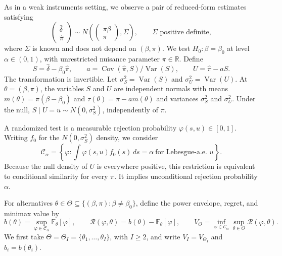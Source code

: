 \documentclass[11pt]{article}
\DeclareMathOperator{\Cov}{Cov}
\DeclareMathOperator{\Var}{Var}
\newcommand{\E}{\mathbb{E}}
\newcommand{\CS}{\mathcal{C}_{\alpha}}
\newcommand{\Reg}{\mathcal{R}}
\begin{document}
As in a weak instruments setting, we observe a pair of reduced-form estimates satisfying
\begin{equation}\label{eq:experiment} \begin{pmatrix}\hat\delta\\\hat\pi\end{pmatrix}\sim N\!\left(\begin{pmatrix}\pi\beta\\\pi\end{pmatrix},\Sigma\right),\qquad \Sigma \text{ positive definite}, \end{equation}
where $\Sigma$ is known and does not depend on $(\beta,\pi)$. We test $H_0:\beta=\beta_0$ at level $\alpha\in(0,1)$, with unrestricted nuisance parameter $\pi\in\mathbb R$. Define
\begin{equation}\label{eq:transformation} S=\hat\delta-\beta_0\hat\pi,\qquad a=\Cov(\hat\pi,S)/\Var(S),\qquad U=\hat\pi-aS. \end{equation}
The transformation is invertible. Let $\sigma_S^2=\Var(S)$ and $\sigma_U^2=\Var(U)$. At $\theta=(\beta,\pi)$, the variables $S$ and $U$ are independent normals with means $m(\theta)=\pi(\beta-\beta_0)$ and $\tau(\theta)=\pi-am(\theta)$ and variances $\sigma_S^2$ and $\sigma_U^2$. Under the null, $S\mid U=u\sim N(0,\sigma_S^2)$, independently of $\pi$.

A randomized test is a measurable rejection probability $\varphi(s,u)\in[0,1]$. Writing $f_0$ for the $N(0,\sigma_S^2)$ density, we consider
\begin{equation}\label{eq:class} \CS=\left\{\varphi:\int\varphi(s,u)f_0(s)\,ds=\alpha\ \text{for Lebesgue-a.e. }u\right\}. \end{equation}
Because the null density of $U$ is everywhere positive, this restriction is equivalent to conditional similarity for every $\pi$. It implies unconditional rejection probability $\alpha$.

For alternatives $\theta\in\Theta\subseteq\{(\beta,\pi):\beta\ne\beta_0\}$, define the power envelope, regret, and minimax value by
\begin{equation}\label{eq:regret} b(\theta)=\sup_{\varphi\in\CS}\E_\theta[\varphi],\qquad \Reg(\varphi,\theta)=b(\theta)-\E_\theta[\varphi],\qquad V_\Theta=\inf_{\varphi\in\CS}\sup_{\theta\in\Theta}\Reg(\varphi,\theta). \end{equation}
We first take $\Theta=\Theta_I=\{\theta_1,\ldots,\theta_I\}$, with $I\ge2$, and write $V_I=V_{\Theta_I}$ and $b_i=b(\theta_i)$.
\end{document}
